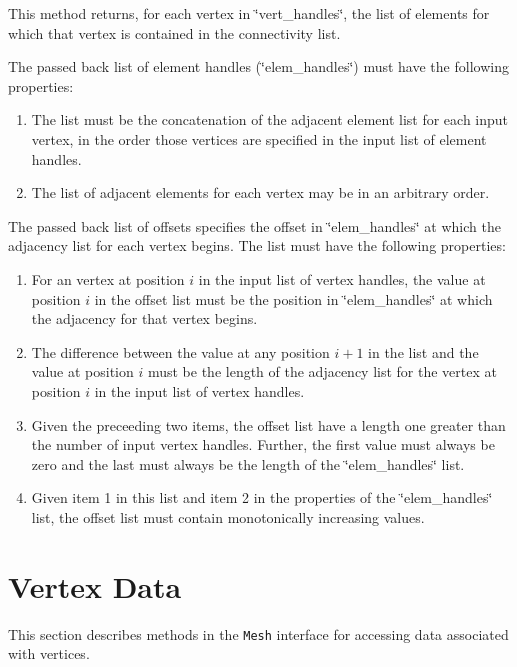 This method returns, for each vertex in \char`\"{}vert\_\-handles\char`\"{}, the list of elements for which that vertex is contained in the
connectivity list. 

The passed back list of element handles (\char`\"{}elem\_\-handles\char`\"{}) must have the following properties:
\begin{enumerate}
\item The list must be the concatenation of the adjacent element list for each input vertex, in the order those vertices are specified
in the input list of element handles.
\item The list of adjacent elements for each vertex may be in an arbitrary order.
\end{enumerate}

The passed back list of offsets specifies the offset in \char`\"{}elem\_\-handles\char`\"{} at which the adjacency list for
each vertex begins.  The list must have the following properties:
\begin{enumerate}
\item For an vertex at position $i$ in the input list of vertex handles, the value at position $i$ in the offset list
must be the position in \char`\"{}elem\_\-handles\char`\"{} at which the adjacency for that vertex begins.
\item The difference between the value at any position $i+1$ in the list and the value at position $i$ must be the length
of the adjacency list for the vertex at position $i$ in the input list of vertex handles.
\item Given the preceeding two items, the offset list have a length one greater than the number of input vertex handles.  
Further, the first value must always be zero and the last must always be the length of the \char`\"{}elem\_\-handles\char`\"{} list.
\item Given item 1 in this list and item 2 in the properties of the \char`\"{}elem\_\-handles\char`\"{} list, the
offset list must contain monotonically increasing values.
\end{enumerate}

\section{Vertex Data}

This section describes methods in the \texttt{Mesh} interface for accessing data associated with vertices.

